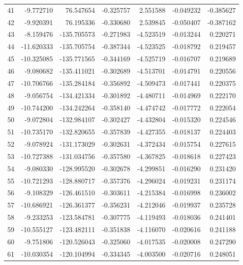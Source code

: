 \begin{tabular}{rrrrrrr}
 41 &  -9.772710 &   76.547654 & -0.325757 &    2.551588 &   -0.049232 & -0.385627 \\
 42 &  -9.920391 &   76.195336 & -0.330680 &    2.539845 &   -0.050407 & -0.387162 \\
 43 &  -8.159476 & -135.705573 & -0.271983 &   -4.523519 &   -0.013244 &  0.220271 \\
 44 & -11.620333 & -135.705754 & -0.387344 &   -4.523525 &   -0.018792 &  0.219457 \\
 45 & -10.325085 & -135.771565 & -0.344169 &   -4.525719 &   -0.016707 &  0.219689 \\
 46 &  -9.080682 & -135.411021 & -0.302689 &   -4.513701 &   -0.014791 &  0.220556 \\
 47 & -10.706766 & -135.284184 & -0.356892 &   -4.509473 &   -0.017441 &  0.220375 \\
 48 &  -9.056754 & -134.421334 & -0.301892 &   -4.480711 &   -0.014969 &  0.222170 \\
 49 & -10.744200 & -134.242264 & -0.358140 &   -4.474742 &   -0.017772 &  0.222054 \\
 50 &  -9.072804 & -132.984107 & -0.302427 &   -4.432804 &   -0.015320 &  0.224546 \\
 51 & -10.735170 & -132.820655 & -0.357839 &   -4.427355 &   -0.018137 &  0.224403 \\
 52 &  -9.078924 & -131.173029 & -0.302631 &   -4.372434 &   -0.015754 &  0.227615 \\
 53 & -10.727388 & -131.034756 & -0.357580 &   -4.367825 &   -0.018618 &  0.227423 \\
 54 &  -9.080330 & -128.995520 & -0.302678 &   -4.299851 &   -0.016290 &  0.231420 \\
 55 & -10.721293 & -128.880717 & -0.357376 &   -4.296024 &   -0.019231 &  0.231174 \\
 56 &  -9.108329 & -126.461510 & -0.303611 &   -4.215384 &   -0.016998 &  0.236002 \\
 57 & -10.686921 & -126.361377 & -0.356231 &   -4.212046 &   -0.019937 &  0.235728 \\
 58 &  -9.233253 & -123.584781 & -0.307775 &   -4.119493 &   -0.018036 &  0.241401 \\
 59 & -10.555127 & -123.482111 & -0.351838 &   -4.116070 &   -0.020616 &  0.241188 \\
 60 &  -9.751806 & -120.526043 & -0.325060 &   -4.017535 &   -0.020008 &  0.247290 \\
 61 & -10.030354 & -120.104994 & -0.334345 &   -4.003500 &   -0.020716 &  0.248051 \\

\end{tabular}
